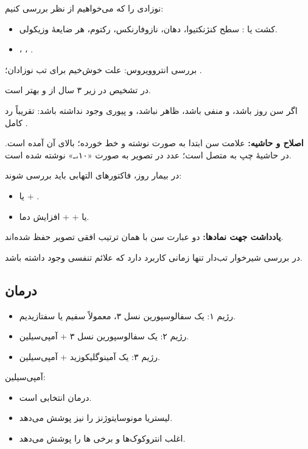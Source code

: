 \documentclass[12pt,a4paper]{article}
\begin{document}
نوزادی را که می‌خواهیم از نظر  بررسی کنیم:
\begin{itemize}
\item کشت یا : سطح کنژنکتیوا، دهان، نازوفارنکس، رکتوم، هر ضایعهٔ وزیکولی.
\item {}، ، .
\end{itemize}

بررسی انتروویروس: علت خوش‌خیم برای تب نوزادان؛ .

 در تشخیص  در زیر ۳ سال از  و  بهتر است.

اگر سن  روز باشد،  و  منفی باشد، ظاهر  نباشد،
 و پیوری وجود نداشته باشد: تقریباً رد کامل .

\textbf{اصلاح و حاشیه:} علامت سن ابتدا به صورت  نوشته و خط خورده؛ بالای آن  آمده است. در حاشیهٔ چپ  به  متصل است؛ عدد در تصویر به صورت «۱۰،ـ» نوشته شده است.

در بیمار  روز، فاکتورهای التهابی باید بررسی شوند:
\begin{itemize}
\item یا  + .
\item یا  +  + افزایش دما.
\end{itemize}
\textbf{یادداشت جهت نمادها:} دو عبارت سن  با همان ترتیب افقی تصویر حفظ شده‌اند.

 در بررسی شیرخوار تب‌دار تنها زمانی کاربرد دارد که علائم تنفسی وجود داشته باشد.

\subsection*{درمان }
\begin{itemize}
\item رژیم ۱: یک سفالوسپورین نسل ۳، معمولاً سفیم یا سفتازیدیم.
\item رژیم ۲: یک سفالوسپورین نسل ۳ + آمپی‌سیلین.
\item رژیم ۳: یک آمینوگلیکوزید + آمپی‌سیلین.
\end{itemize}

آمپی‌سیلین:
\begin{itemize}
\item درمان انتخابی  است.
\item لیستریا مونوسایتوژنز را نیز پوشش می‌دهد.
\item اغلب انتروکوک‌ها و برخی ها را پوشش می‌دهد.
\end{itemize}
\end{document}
